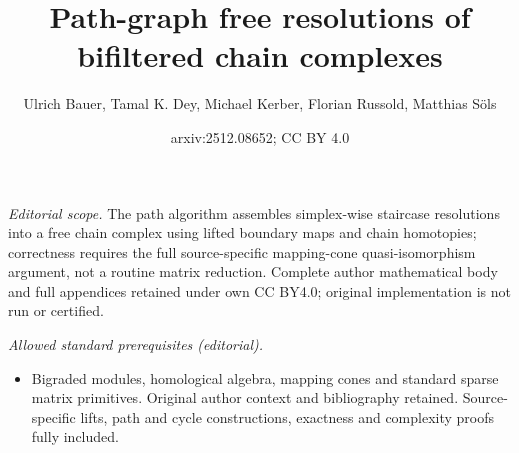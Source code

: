 \documentclass[11pt]{article}
\title{Path-graph free resolutions of bifiltered chain complexes}
\author{Ulrich Bauer, Tamal K. Dey, Michael Kerber, Florian Russold, Matthias Söls}
\date{arxiv:2512.08652; CC BY 4.0}
\begin{document}
\maketitle
\noindent\textit{Editorial scope.} The path algorithm assembles simplex-wise staircase resolutions into a free chain complex using lifted boundary maps and chain homotopies; correctness requires the full source-specific mapping-cone quasi-isomorphism argument, not a routine matrix reduction. Complete author mathematical body and full appendices retained under own CC BY4.0; original implementation is not run or certified.\par\medskip
\noindent\textit{Allowed standard prerequisites (editorial).}\begin{itemize}
\item Bigraded modules, homological algebra, mapping cones and standard sparse matrix primitives. Original author context and bibliography retained. Source-specific lifts, path and cycle constructions, exactness and complexity proofs fully included.
\end{itemize}\medskip
\end{document}
